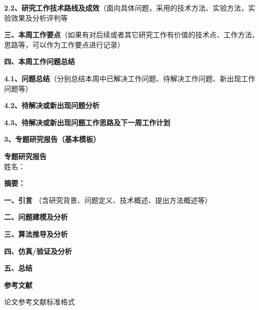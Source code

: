 \documentclass[a4paper,zihao=false]{ctexart}
\begin{document}
\vspace{1em}
\noindent\textbf{2.2、研究工作技术路线及成效}（面向具体问题，采用的技术方法、实验方法，实验效果及分析评判等

\vspace{2em}
\noindent\textbf{三、本周工作要点}（如果有对后续或者其它研究工作有价值的技术点、工作方法、思路等，可以作为工作要点进行记录）

\vspace{2em}
\noindent\textbf{四、本周工作问题总结}

\noindent\textbf{4.1、问题总结}（分别总结本周中已解决工作问题、待解决工作问题、新出现工作问题等）

\vspace{1em}
\noindent\textbf{4.2、待解决或新出现问题分析}

\vspace{1em}
\noindent\textbf{4.3、待解决或新出现问题工作思路及下一周工作计划}





\clearpage
\noindent\textbf{3、专题研究报告（基本模板）}
\begin{center}
    \textbf{\fontsize{20pt}{25pt}\selectfont 专题研究报告 }\\
    \vspace{0.5em}
    姓名：\\
\end{center}


\noindent\textbf{摘要：}

\vspace{2em}
\noindent\textbf{一、引言} （含研究背景、问题定义、技术概述、提出方法概述等）

\vspace{2em}
\noindent\textbf{二、问题建模及分析}

\vspace{2em}
\noindent\textbf{三、算法推导及分析}

\vspace{2em}
\noindent\textbf{四、仿真/验证及分析}

\vspace{2em}
\noindent\textbf{五、总结}


\vspace{2em}
\noindent\textbf{参考文献}

论文参考文献标准格式
\end{document}
